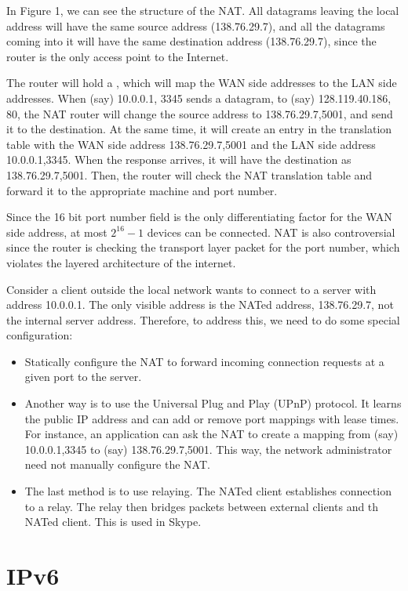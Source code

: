 \documentclass[12pt,letterpaper]{book}
\theoremstyle{definition}
\begin{document}
In Figure 1, we can see the structure of the NAT. All datagrams leaving the local address will have the same source address (138.76.29.7), and all the datagrams coming into it will have the same destination address (138.76.29.7), since the router is the only access point to the Internet.

The router will hold a , which will map the WAN side addresses to the LAN side addresses. When (say) 10.0.0.1, 3345 sends a datagram, to (say) 128.119.40.186, 80, the NAT router will change the source address to 138.76.29.7,5001, and send it to the destination. At the same time, it will create an entry in the translation table with the WAN side address 138.76.29.7,5001 and the LAN side address 10.0.0.1,3345. When the response arrives, it will have the destination as 138.76.29.7,5001. Then, the router will check the NAT translation table and forward it to the appropriate machine and port number.

Since the 16 bit port number field is the only differentiating factor for the WAN side address, at most $2^{16}-1$ devices can be connected. NAT is also controversial since the router is checking the transport layer packet for the port number, which violates the layered architecture of the internet.

Consider a client outside the local network wants to connect to a server with address 10.0.0.1. The only visible address is the NATed address, 138.76.29.7, not the internal server address. Therefore, to address this, we need to do some special configuration:

\begin{itemize}
  \item Statically configure the NAT to forward incoming connection requests at a given port to the server.
  \item Another way is to use the Universal Plug and Play (UPnP) protocol. It learns the public IP address and can add or remove port mappings with lease times. For instance, an application can ask the NAT to create a mapping from (say) 10.0.0.1,3345 to (say) 138.76.29.7,5001. This way, the network administrator need not manually configure the NAT.
  \item The last method is to use relaying. The NATed client establishes connection to a relay. The relay then bridges packets between external clients and th NATed client. This is used in Skype.
\end{itemize}

\section{IPv6}
\end{document}
